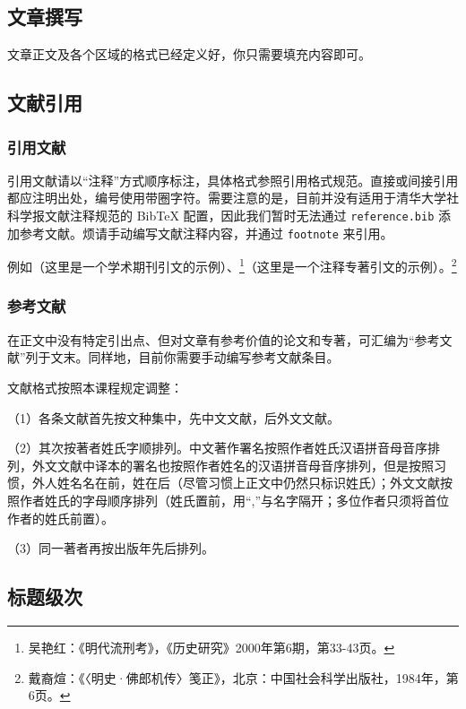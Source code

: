 \documentclass{wc-article}
\begin{document}
\subsection{文章撰写}

文章正文及各个区域的格式已经定义好，你只需要填充内容即可。

\subsection{文献引用}

\subsubsection{引用文献}

引用文献请以“注释”方式顺序标注，具体格式参照引用格式规范。直接或间接引用都应注明出处，编号使用带圈字符。需要注意的是，目前并没有适用于清华大学社科学报文献注释规范的 BibTeX 配置，因此我们暂时无法通过 \texttt{reference.bib} 添加参考文献。烦请手动编写文献注释内容，并通过 \texttt{footnote} 来引用。

例如（这里是一个学术期刊引文的示例）、\footnote{吴艳红：《明代流刑考》，《历史研究》2000年第6期，第33-43页。}（这里是一个注释专著引文的示例）。\footnote{戴裔煊：《〈明史·佛郎机传〉笺正》，北京：中国社会科学出版社，1984年，第6页。}

\subsubsection{参考文献}

在正文中没有特定引出点、但对文章有参考价值的论文和专著，可汇编为“参考文献”列于文末。同样地，目前你需要手动编写参考文献条目。

文献格式按照本课程规定调整：

（1）各条文献首先按文种集中，先中文文献，后外文文献。

（2）其次按著者姓氏字顺排列。中文著作署名按照作者姓氏汉语拼音母音序排列，外文文献中译本的署名也按照作者姓名的汉语拼音母音序排列，但是按照习惯，外人姓名名在前，姓在后（尽管习惯上正文中仍然只标识姓氏）；外文文献按照作者姓氏的字母顺序排列（姓氏置前，用“,”与名字隔开；多位作者只须将首位作者的姓氏前置）。 

（3）同一著者再按出版年先后排列。

\subsection{标题级次}
\end{document}

